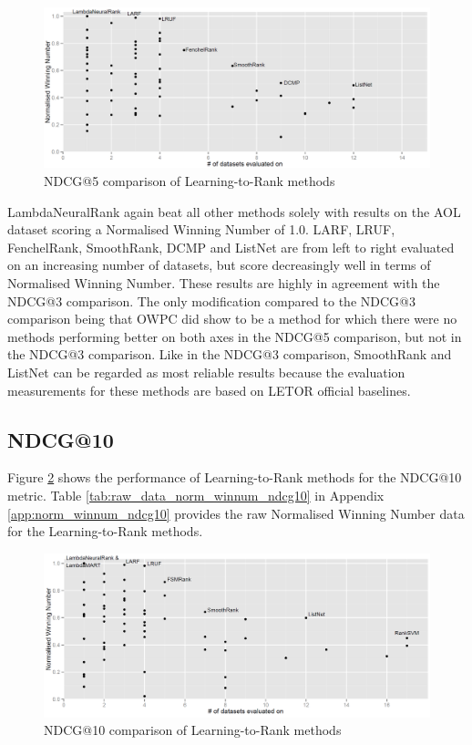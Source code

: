 \documentclass{sig-alternate-2013}
\begin{document}
\begin{figure}[!h]
\includegraphics[scale=0.285]{gfx/ndcg5_winnum}
\caption{NDCG@5 comparison of Learning-to-Rank methods}
\label{fig:normalised_winning_number_ndcg5}
\end{figure}

LambdaNeuralRank again beat all other methods solely with results on the AOL dataset scoring a Normalised Winning Number of 1.0. LARF, LRUF, FenchelRank, SmoothRank, DCMP and ListNet are from left to right evaluated on an increasing number of datasets, but score decreasingly well in terms of Normalised Winning Number. These results are highly in agreement with the NDCG@3 comparison. The only modification compared to the NDCG@3 comparison being that OWPC did show to be a method for which there were no methods performing better on both axes in the NDCG@5 comparison, but not in the NDCG@3 comparison. Like in the NDCG@3 comparison, SmoothRank and ListNet can be regarded as most reliable results because the evaluation measurements for these methods are based on LETOR official baselines.

\subsection{NDCG@10}
Figure \ref{fig:normalised_winning_number_ndcg10} shows the performance of Learning-to-Rank methods for the NDCG@10 metric. Table \ref{tab:raw_data_norm_winnum_ndcg10} in Appendix \ref{app:norm_winnum_ndcg10} provides the raw Normalised Winning Number data for the Learning-to-Rank methods.\\

\begin{figure}[!h]
\includegraphics[scale=0.285]{gfx/ndcg10_winnum}
\caption{NDCG@10 comparison of Learning-to-Rank methods}
\label{fig:normalised_winning_number_ndcg10}
\end{figure}
\end{document}
